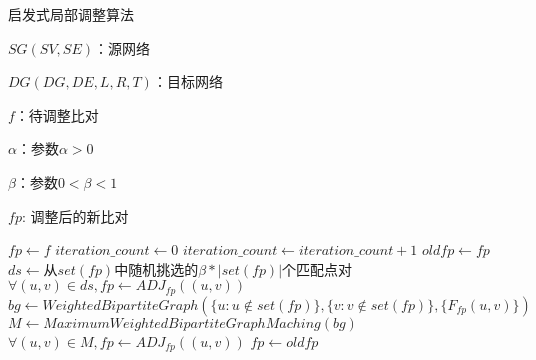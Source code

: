 \begin{small}
\begin{algorithm}[!htb]
{
\caption{启发式局部调整算法}
\label{alg:1}
    \begin{algorithmic}[1]
    \Require
    $SG(SV,SE)$：源网络
    
    $DG(DG,DE,L,R,T)$：目标网络
    
    $f$：待调整比对
    
    $\alpha$：参数$\alpha>0$
    
    $\beta$：参数$0<\beta<1$
    
    \Ensure
    $fp$: 调整后的新比对
    
    \State $fp \gets f$
    \State $iteration\_count \gets 0$
        \State $iteration\_count\gets iteration\_count+1$
        \State $oldfp\gets fp$
        \State $ds\gets$从$set(fp)$中随机挑选的$\beta*|set(fp)|$个匹配点对
        \State $\forall (u,v)\in ds,fp\gets ADJ_{fp}((u,v))$
        \State $bg\gets WeightedBipartiteGraph(\{u:u\notin set(fp)\},\{v:v\notin set(fp)\},\{F_{fp}(u,v)\})$
        \State $M\gets MaximumWeightedBipartiteGraphMaching(bg)$
        \State $\forall (u,v)\in M,fp\gets ADJ_{fp}((u,v))$
            \State $fp\gets oldfp$
        \EndIf
    \EndWhile
    \end{algorithmic}    
}
\end{algorithm}
\end{small}

